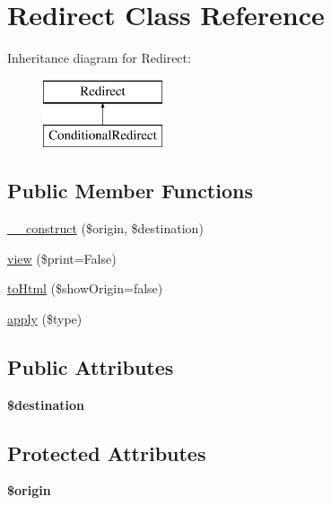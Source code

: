 \hypertarget{classRedirect}{\section{Redirect Class Reference}
\label{classRedirect}
}
Inheritance diagram for Redirect\-:\begin{figure}[H]
\begin{center}
\leavevmode
\includegraphics[height=2.000000cm]{classRedirect}
\end{center}
\end{figure}
\subsection*{Public Member Functions}
\begin{DoxyCompactItemize}
\item 
\hyperlink{classRedirect_a6fe77455d999f04c09a1265c20a22b6b}{\-\_\-\-\_\-construct} (\$origin, \$destination)
\item 
\hyperlink{classRedirect_a09c0e89ddf86eb41739ec362c4fa9351}{view} (\$print=False)
\item 
\hyperlink{classRedirect_a610648cb74203284297fcb5a46501a4d}{to\-Html} (\$show\-Origin=false)
\item 
\hyperlink{classRedirect_a1b0db57bb048448e198664670c76e32f}{apply} (\$type)
\end{DoxyCompactItemize}
\subsection*{Public Attributes}
\begin{DoxyCompactItemize}
\item 
\hypertarget{classRedirect_ab1e1ea02f9fcbf7509e9909d90f9fd9f}{{\bfseries \$destination}}\label{classRedirect_ab1e1ea02f9fcbf7509e9909d90f9fd9f}

\end{DoxyCompactItemize}
\subsection*{Protected Attributes}
\begin{DoxyCompactItemize}
\item 
\hypertarget{classRedirect_a0192db568f5f5e35b7f8ab46f1582092}{{\bfseries \$origin}}\label{classRedirect_a0192db568f5f5e35b7f8ab46f1582092}

\end{DoxyCompactItemize}


